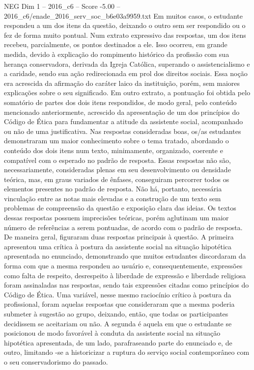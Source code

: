\begin{textsample}{NEG Dim 1 – 2016\_c6 – Score -5.00 – 2016\_c6/enade\_2016\_serv\_soc\_b6e03a9959.txt}
Em muitos casos, o estudante respondeu a um dos itens da questão, deixando o outro sem ser respondido ou o fez de forma muito pontual.
Num extrato expressivo das respostas, um dos itens recebeu, parcialmente, os pontos destinados a ele.
Isso ocorreu, em grande medida, devido à explicação do rompimento histórico da profissão com sua herança conservadora, derivada da Igreja Católica, superando o assistencialismo e a caridade, sendo sua ação redirecionada em prol dos direitos sociais.
Essa noção era acrescida da afirmação do caráter laico da instituição, porém, sem maiores explicações sobre o seu significado.
Em outro extrato, a pontuação foi obtida pelo somatório de partes dos dois itens respondidos, de modo geral, pelo conteúdo mencionado anteriormente, acrescido da apresentação de um dos princípios do Código de Ética para fundamentar a atitude da assistente social, acompanhado ou não de uma justificativa.
Nas respostas consideradas boas, os/as estudantes demonstraram um maior conhecimento sobre o tema tratado, abordando o conteúdo dos dois itens num texto, minimamente, organizado, coerente e compatível com o esperado no padrão de resposta.
Essas respostas não são, necessariamente, consideradas plenas em seu desenvolvimento ou densidade teórica, mas, em graus variados de ênfases, conseguiram percorrer todos os elementos presentes no padrão de resposta.
Não há, portanto, necessária vinculação entre as notas mais elevadas e a construção de um texto sem problemas de compreensão da questão e exposição clara das ideias.
Os textos dessas respostas possuem imprecisões teóricas, porém aglutinam um maior número de referências a serem pontuadas, de acordo com o padrão de resposta.
De maneira geral, figuraram duas respostas principais à questão.
A primeira apresentou uma crítica à postura da assistente social na situação hipotética apresentada no enunciado, demonstrando que muitos estudantes discordaram da forma com que a mesma respondeu ao usuário e, consequentemente, expressões como falta de respeito, desrespeito à liberdade de expressão e liberdade religiosa foram assinaladas nas respostas, sendo tais expressões citadas como princípios do Código de Ética.
Uma variável, nesse mesmo raciocínio crítico à postura da profissional, foram aquelas respostas que consideraram que a mesma poderia submeter à sugestão ao grupo, deixando, então, que todas os participantes decidissem se aceitariam ou não.
A segunda é aquela em que o estudante se posicionou de modo favorável à conduta da assistente social na situação hipotética apresentada, de um lado, parafraseando parte do enunciado e, de outro, limitando -se a historicizar a ruptura do serviço social contemporâneo com o seu conservadorismo do passado.

\end{textsample}
